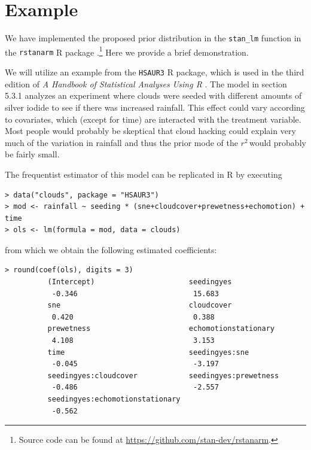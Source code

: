 \documentclass[11pt]{article}
\newcommand{\Rsq}{$r^2\,$}
\begin{document}
\section{Example}
\label{sec:example}


We have implemented the proposed prior distribution in the {\tt stan\_lm}
function in the {\tt rstanarm} R package \cite{rstanarm}.\footnote{Source
code can be found at \url{https://github.com/stan-dev/rstanarm}.}
Here we provide a brief demonstration.

We will utilize an example from the {\tt HSAUR3} R package, which is used in the
third edition of \emph{A Handbook of Statistical Analyses Using R}
\cite{HSAUR3-book}. The model in section 5.3.1 analyzes an experiment where
clouds were seeded with different amounts of silver iodide to see if there was
increased rainfall. This effect could vary according to covariates, which
(except for time) are interacted with the treatment variable. Most people would
probably be skeptical that cloud hacking could explain very much of the
variation in rainfall and thus the prior mode of the \Rsq would probably be
fairly small.

The frequentist estimator of this model can be replicated in R by executing

\vspace{.5cm}
\begin{lstlisting}[frame=lines]
> data("clouds", package = "HSAUR3")
> mod <- rainfall ~ seeding * (sne+cloudcover+prewetness+echomotion) + time
> ols <- lm(formula = mod, data = clouds)
\end{lstlisting}
\vspace{.5cm}

\noindent from which we obtain the following estimated coefficients:

\vspace{.5cm}
\begin{lstlisting}[frame=lines]
> round(coef(ols), digits = 3)
          (Intercept)                      seedingyes
           -0.346                           15.683
          sne                              cloudcover
           0.420                            0.388
          prewetness                       echomotionstationary
           4.108                            3.153
          time                             seedingyes:sne
           -0.045                           -3.197
          seedingyes:cloudcover            seedingyes:prewetness
           -0.486                           -2.557
          seedingyes:echomotionstationary
           -0.562
\end{lstlisting}
\vspace{.5cm}
\end{document}
